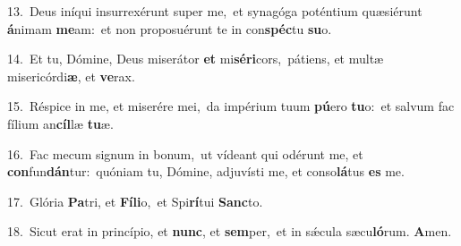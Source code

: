 {\numbfont\textcolor{\numbcolor}{13.}}~Deus iníqui insurrexérunt super me,~\dagger et synagóga poténtium quæsiérunt \textbf{á}\-nimam \textbf{me}\-am:~\star et non proposuérunt te in con\-\textbf{spéc}\-tu \textbf{su}\-o.\par
{\numbfont\textcolor{\numbcolor}{14.}}~Et tu, Dómine, Deus miserátor \textbf{et} mi\-\textbf{sé}\-\textbf{ri}cors,~\star pátiens, et multæ misericórdi\-\textbf{æ}\-, et \textbf{ve}\-rax.\par
{\numbfont\textcolor{\numbcolor}{15.}}~Réspice in me, et miserére mei,~\dagger da impérium tuum \textbf{pú}\-ero \textbf{tu}\-o:~\star et salvum fac fílium an\-\textbf{cíl}\-læ \textbf{tu}\-æ.\par
{\numbfont\textcolor{\numbcolor}{16.}}~Fac mecum signum in bonum,~\dagger ut vídeant qui odérunt me, et \textbf{con}\-fun\-\textbf{dán}\-tur:~\star quóniam tu, Dómine, adjuvísti me, et conso\-\textbf{lá}\-tus \textbf{es} me.\par
{\numbfont\textcolor{\numbcolor}{17.}}~Glória \textbf{Pa}\-tri, et \textbf{Fí}\-\textbf{li}o,~\star et Spi\-\textbf{rí}\-tui \textbf{Sanc}\-to.\par
{\numbfont\textcolor{\numbcolor}{18.}}~Sicut erat in princípio, et \textbf{nunc}\-, et \textbf{sem}\-per,~\star et in sǽcula sæcu\-\textbf{ló}\-rum. \textbf{A}\-men.\par
